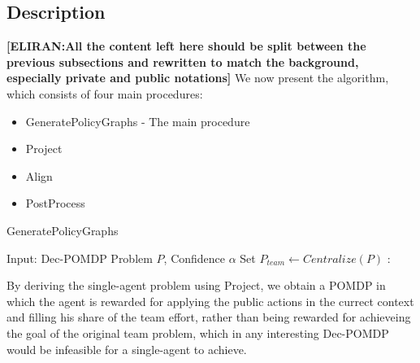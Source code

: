 \documentclass[letterpaper]{article} %
\newcommand{\eliran}[1]{\textbf{[\color{red}ELIRAN:#1]}}
\begin{document}
\subsection{Description}
\eliran{All the content left here should be split between the previous subsections and rewritten to match the background, especially private and public notations}
We now present the algorithm, which consists of four main procedures:
\begin{itemize}
\item{GeneratePolicyGraphs - The main procedure}
\item{Project}
\item{Align}
\item{PostProcess}
\end{itemize}
\begin{algorithm}
\caption{GeneratePolicyGraphs}
\begin{algorithmic}[tbph]
\State Input: Dec-POMDP Problem $P$, Confidence $\alpha$
\State Set $P_{team} \gets Centralize(P)$
\EndFor
{}:
\Else
{}
\EndIf
\EndWhile
{}
\end{algorithmic}
\end{algorithm}

By deriving the single-agent problem using Project, we obtain a POMDP in which the agent is rewarded for applying the public actions in the currect context and filling his share of the team effort, rather than being rewarded for achieveing the goal of the original team problem, which in any interesting Dec-POMDP would be infeasible for a single-agent to achieve.\\
\end{document}
